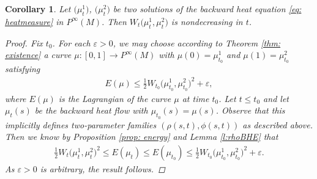 \documentclass[10pt,a4paper]{article}
\numberwithin{equation}{section}
\newtheorem{cor}[thm]{Corollary}
\begin{document}
\begin{cor} \label{c:WDM} Let $\big(\mu^1_t\big)$, $\big(\mu^2_t\big)$ be two solutions of the backward heat equation \eqref{eq: heatmeasure}
in $P^\infty(M)$. Then $W_{t}\big(\mu^1_t,\mu^2_t\big)$ is nondecreasing in $t$.

\begin{proof}
 Fix $t_0$. For each $\varepsilon>0$, we may choose according to Theorem \ref{thm: existence} a curve $\mu\colon [0,1]\to P^\infty(M)$ with $\mu(0)=\mu^1_{t_0}$ and $\mu(1)=\mu^2_{t_0}$ satisfying
 \begin{align*}
 E(\mu)\leq \frac12 W_{t_0}\big(\mu^1_{t_0},\mu^2_{t_0}\big)^2+\varepsilon,
 \end{align*}
 where $E(\mu)$ is the Lagrangian of the curve $\mu$ at time $t_0$.
 Let $t\leq t_0$ and let $\mu_t(s)$ be the backward heat flow with $\mu_{t_0}(s)=\mu(s)$. Observe that this implicitly defines two-parameter families $(\rho(s,t), \phi(s,t))$ as described above. Then we know by Proposition \ref{prop: energy} and Lemma \ref{l:rhoBHE} that
 \begin{align*}
 \frac12 W_{t}\big(\mu^1_t,\mu^2_t\big)^2\leq E(\mu_t)\leq E(\mu_{t_0})\leq \frac12 W_{t_0}\big(\mu^1_{t_0},\mu^2_{t_0}\big)^2+\varepsilon.
 \end{align*}
 As $\varepsilon > 0$ is arbitrary, the result follows.
\end{proof}
\end{cor}
\end{document}
